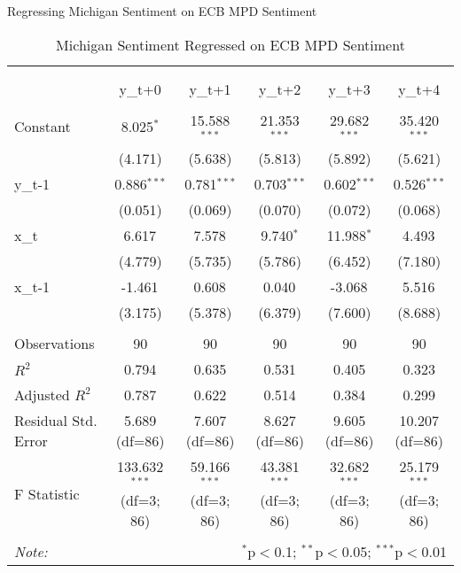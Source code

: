 \documentclass[12pt, letterpaper]{article}
\begin{document}
Regressing Michigan Sentiment on ECB MPD Sentiment

\begin{table}[H] 
    \begin{adjustbox}{width=\textwidth}
    \centering
  \caption{Michigan Sentiment Regressed on ECB MPD Sentiment}
\begin{tabular}{@{\extracolsep{5pt}}lccccc}
\\[-1.8ex]\hline
\hline \\[-1.8ex]
\\[-1.8ex] & \multicolumn{1}{c}{y_{t+0}} & \multicolumn{1}{c}{y_{t+1}} & \multicolumn{1}{c}{y_{t+2}} & \multicolumn{1}{c}{y_{t+3}} & \multicolumn{1}{c}{y_{t+4}}  \\
\hline \\[-1.8ex]
 Constant & 8.025$^{*}$ & 15.588$^{***}$ & 21.353$^{***}$ & 29.682$^{***}$ & 35.420$^{***}$ \\
& (4.171) & (5.638) & (5.813) & (5.892) & (5.621) \\
 y_{t-1} & 0.886$^{***}$ & 0.781$^{***}$ & 0.703$^{***}$ & 0.602$^{***}$ & 0.526$^{***}$ \\
& (0.051) & (0.069) & (0.070) & (0.072) & (0.068) \\
 x_{t} & 6.617$^{}$ & 7.578$^{}$ & 9.740$^{*}$ & 11.988$^{*}$ & 4.493$^{}$ \\
& (4.779) & (5.735) & (5.786) & (6.452) & (7.180) \\
 x_{t-1} & -1.461$^{}$ & 0.608$^{}$ & 0.040$^{}$ & -3.068$^{}$ & 5.516$^{}$ \\
& (3.175) & (5.378) & (6.379) & (7.600) & (8.688) \\
\hline \\[-1.8ex]
 Observations & 90 & 90 & 90 & 90 & 90 \\
 $R^2$ & 0.794 & 0.635 & 0.531 & 0.405 & 0.323 \\
 Adjusted $R^2$ & 0.787 & 0.622 & 0.514 & 0.384 & 0.299 \\
 Residual Std. Error & 5.689 (df=86) & 7.607 (df=86) & 8.627 (df=86) & 9.605 (df=86) & 10.207 (df=86) \\
 F Statistic & 133.632$^{***}$ (df=3; 86) & 59.166$^{***}$ (df=3; 86) & 43.381$^{***}$ (df=3; 86) & 32.682$^{***}$ (df=3; 86) & 25.179$^{***}$ (df=3; 86) \\
\hline
\hline \\[-1.8ex]
\textit{Note:} & \multicolumn{5}{r}{$^{*}$p$<$0.1; $^{**}$p$<$0.05; $^{***}$p$<$0.01} \\
\end{tabular}
\end{adjustbox}
\end{table}
\end{document}
